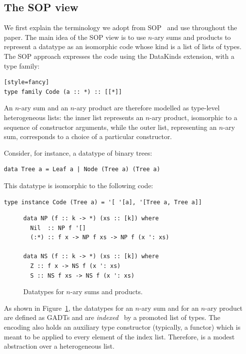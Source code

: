 \documentclass[sigplan,screen,review,anonymous]{acmart}
\begin{document}
\subsection{The SOP view}
\label{sec:sop-view}

We first explain the terminology we adopt from SOP~\cite{VriLoeh2014,Loeh2015} and use throughout the paper. The main idea of the SOP view is to use $n$-ary sums and products to represent a datatype as an isomorphic code whose kind is a list of lists of types. The SOP approach expresses the code using the \textsf{DataKinds} extension, with a type family:
\begin{lstlisting}[style=fancy][style=fancy]
type family Code (a :: *) :: [[*]]
\end{lstlisting}
An $n$-ary sum and an $n$-ary product are therefore modelled as type-level heterogeneous lists: the inner list represents an $n$-ary product, isomorphic to a sequence of constructor arguments, while the outer list, representing an $n$-ary sum, corresponds to a choice of a particular constructor.

Consider, for instance, a datatype of binary trees:
\begin{lstlisting}[style=fancy]
data Tree a = Leaf a | Node (Tree a) (Tree a)
\end{lstlisting}
This datatype is isomorphic to the following code:
\begin{lstlisting}[style=fancy]
type instance Code (Tree a) = '[ '[a], '[Tree a, Tree a]]
\end{lstlisting}

\begin{figure}[t]
\begin{CenteredBox}
{\lset
\begin{lstlisting}[style=fancy]
data NP (f :: k -> *) (xs :: [k]) where
  Nil  :: NP f '[]
  (:*) :: f x -> NP f xs -> NP f (x ': xs)

data NS (f :: k -> *) (xs :: [k]) where
  Z :: f x -> NS f (x ': xs)
  S :: NS f xs -> NS f (x ': xs)
\end{lstlisting}}
\end{CenteredBox}
\caption{Datatypes for $n$-ary sums and products.}
\label{fig:ns-np}
\end{figure}


As shown in Figure~\ref{fig:ns-np}, the datatypes  for an $n$-ary sum and  for an $n$-ary product are defined as GADTs and are \emph{indexed}~\cite{HiJeLo2004} by a promoted list of types. The encoding also holds an auxiliary type constructor  (typically, a functor) which is meant to be applied to every element of the index list. Therefore,  is a modest abstraction over a heterogeneous list. 
\end{document}

